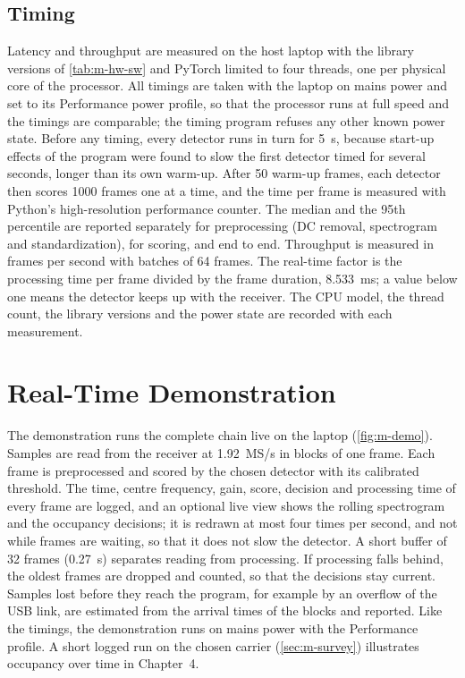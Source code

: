 \subsection{Timing}
\label{sec:m-timing}

Latency and throughput are measured on the host laptop with the library versions of \cref{tab:m-hw-sw} and PyTorch limited to four threads, one per physical core of the processor. All timings are taken with the laptop on mains power and set to its Performance power profile, so that the processor runs at full speed and the timings are comparable; the timing program refuses any other known power state. Before any timing, every detector runs in turn for \qty{5}{\second}, because start-up effects of the program were found to slow the first detector timed for several seconds, longer than its own warm-up. After \num{50} warm-up frames, each detector then scores \num{1000} frames one at a time, and the time per frame is measured with Python's high-resolution performance counter. The median and the 95th percentile are reported separately for preprocessing (DC removal, spectrogram and standardization), for scoring, and end to end. Throughput is measured in frames per second with batches of 64 frames. The real-time factor is the processing time per frame divided by the frame duration, \qty{8.533}{\milli\second}; a value below one means the detector keeps up with the receiver. The CPU model, the thread count, the library versions and the power state are recorded with each measurement.

\section{Real-Time Demonstration}
\label{sec:m-demo}

The demonstration runs the complete chain live on the laptop (\cref{fig:m-demo}). Samples are read from the receiver at \qty{1.92}{MS/s} in blocks of one frame. Each frame is preprocessed and scored by the chosen detector with its calibrated threshold. The time, centre frequency, gain, score, decision and processing time of every frame are logged, and an optional live view shows the rolling spectrogram and the occupancy decisions; it is redrawn at most four times per second, and not while frames are waiting, so that it does not slow the detector. A short buffer of 32 frames (\qty{0.27}{\second}) separates reading from processing. If processing falls behind, the oldest frames are dropped and counted, so that the decisions stay current. Samples lost before they reach the program, for example by an overflow of the USB link, are estimated from the arrival times of the blocks and reported. Like the timings, the demonstration runs on mains power with the Performance profile. A short logged run on the chosen carrier (\cref{sec:m-survey}) illustrates occupancy over time in Chapter~4.

